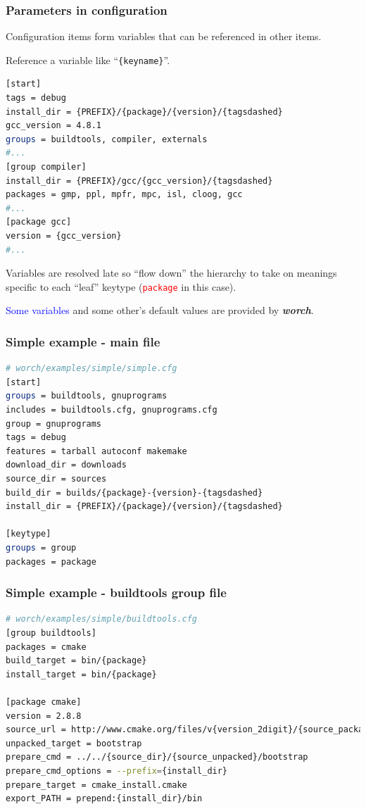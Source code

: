 \documentclass[xcolor=dvipsnames]{beamer}
\newcommand{\app}[1]{\textbf{\textit{#1}}\xspace}
\def\worch{\app{worch}}
\begin{document}
\begin{frame}[fragile]
  \frametitle{Parameters in configuration}

  Configuration items form variables that can be referenced in other items.

  Reference a variable like ``\texttt{\{keyname\}}''.

  \begin{lstlisting}[language=bash,emph={package,version,gcc_version},emph={[2]PREFIX,tagsdashed},emphstyle={[2]\color{blue}}]
[start]
tags = debug
install_dir = {PREFIX}/{package}/{version}/{tagsdashed}
gcc_version = 4.8.1
groups = buildtools, compiler, externals
#...
[group compiler]
install_dir = {PREFIX}/gcc/{gcc_version}/{tagsdashed}
packages = gmp, ppl, mpfr, mpc, isl, cloog, gcc
#...
[package gcc]
version = {gcc_version}
#...
  \end{lstlisting}
  Variables are resolved late so ``flow down'' the hierarchy to take on meanings specific to each ``leaf'' keytype (\textcolor{red}{\texttt{package}} in this case).

  \textcolor{blue}{Some variables} and some other's default values are provided by \worch.
\end{frame}


\begin{frame}[fragile]
  \frametitle{Simple example - main file}
    \begin{lstlisting}[language=bash,emph={start,keytype}]
# worch/examples/simple/simple.cfg
[start]
groups = buildtools, gnuprograms
includes = buildtools.cfg, gnuprograms.cfg
group = gnuprograms
tags = debug
features = tarball autoconf makemake
download_dir = downloads
source_dir = sources
build_dir = builds/{package}-{version}-{tagsdashed}
install_dir = {PREFIX}/{package}/{version}/{tagsdashed}

[keytype]
groups = group
packages = package
    \end{lstlisting}
\end{frame}

\begin{frame}[fragile]
  \frametitle{Simple example - buildtools group file}
    \begin{lstlisting}[language=bash,emph={start,keytype}]
# worch/examples/simple/buildtools.cfg
[group buildtools]
packages = cmake
build_target = bin/{package}
install_target = bin/{package}

[package cmake]
version = 2.8.8
source_url = http://www.cmake.org/files/v{version_2digit}/{source_package}
unpacked_target = bootstrap
prepare_cmd = ../../{source_dir}/{source_unpacked}/bootstrap
prepare_cmd_options = --prefix={install_dir}
prepare_target = cmake_install.cmake
export_PATH = prepend:{install_dir}/bin
    \end{lstlisting}
\end{frame}
\end{document}
